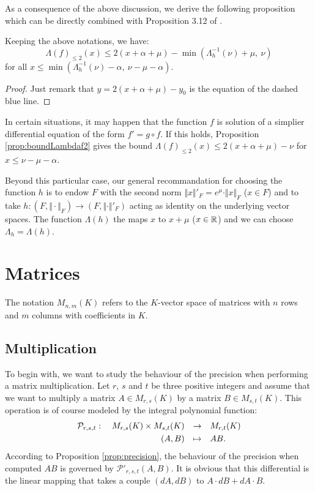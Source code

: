 \documentclass{sig-alternate}
\begin{document}
As a consequence of the above discussion, we derive the following 
proposition which can be directly combined with Proposition 3.12 of 
\cite{caruso-roe-vaccon:14a}.

\begin{prop}
\label{prop:boundLambdaf2}
Keeping the above notations, we have:
$$\Lambda(f)_{\leq 2} (x) \leq 2(x + \alpha + \mu) -
\min(\Lambda_h^{-1}(\nu) + \mu, \: \nu)$$
for all $x \leq \min(\Lambda_h^{-1}(\nu) - \alpha, \: \nu - \mu - \alpha)$.
\end{prop}

\begin{proof}
Just remark that $y = 2(x + \alpha + \mu) - y_0$ is the equation of 
the dashed blue line.
\end{proof}

\begin{rem}
In certain situations,
it may happen that the function $f$ is solution of a simplier 
differential equation of the form $f' = g \circ f$. If this holds, 
Proposition \ref{prop:boundLambdaf2} gives the bound $\Lambda(f)_{\leq 
2} (x) \leq 2(x + \alpha + \mu) - \nu$ for $x \leq \nu - \mu - \alpha$.

Beyond this particular case, our general recommandation for choosing the 
function $h$ is to endow $F$ with the second norm $\Vert x \Vert'_F = 
e^\mu \cdot \Vert x \Vert_F$ ($x \in F$) and to take $h : (F, \Vert 
\cdot \Vert_F) \to (F, \Vert \cdot \Vert'_F)$ acting as identity on the
underlying vector spaces. The function $\Lambda(h)$ the maps $x$ to $x + 
\mu$ ($x \in \mathbb R$) and we can choose $\Lambda_h = \Lambda(h)$.
\end{rem}

\section{Matrices}
\label{sec:matrices}


The notation $M_{n,m}(K)$ refers to the $K$-vector space of matrices 
with $n$ rows and $m$ columns with coefficients in $K$.

\subsection{Multiplication}
\label{subsec:mulmatrix}

To begin with, we want to study the behaviour of the precision when 
performing a matrix multiplication. Let $r$, $s$ and $t$ be three 
positive integers and assume that we want to multiply a matrix $A \in 
M_{r,s}(K)$ by a matrix $B \in M_{s,t}(K)$. This operation is of course 
modeled by the integral polynomial function:
$$\begin{array}{rcl}
\mathcal P_{r,s,t} : \quad M_{r,s}(K) \times M_{s,t}(K) & \to & 
M_{r,t}(K) \smallskip \\
(A,B) & \mapsto & AB.
\end{array}$$
According to Proposition \ref{prop:precision}, the behaviour of the precision when 
computed $AB$ is governed by $\mathcal P'_{r,s,t}(A,B)$. It is obvious 
that this differential is the linear mapping that takes a couple 
$(dA,dB)$ to $A \cdot dB + dA \cdot B$.
\end{document}
